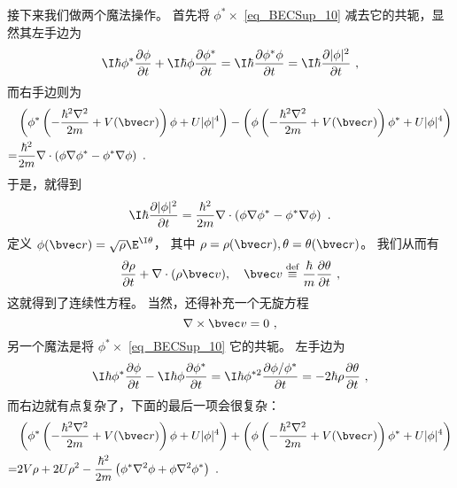 接下来我们做两个魔法操作。 首先将 $\phi^*\times$ \autoref{eq_BECSup_10} 减去它的共轭，显然其左手边为
\begin{equation}
\I\hbar\phi^*\frac{\partial\phi}{\partial t} + \I\hbar\phi\frac{\partial\phi^*}{\partial t} = \I\hbar\frac{\partial\phi^*\phi}{\partial t} = \I\hbar\frac{\partial|\phi|^2}{\partial t}~,
\end{equation}
而右手边则为
\begin{equation}
\begin{split}
&\left(\phi^* \left(-\frac{\hbar^2\nabla^2}{2m}+V({\bvec r})\right)\phi + U|\phi|^4\right) -\left(\phi \left(-\frac{\hbar^2\nabla^2}{2m}+V({\bvec r})\right)\phi^* + U|\phi|^4\right) \\
=& \frac{\hbar^2}{2m}\nabla\cdot\left(\phi\nabla\phi^* - \phi^*\nabla\phi\right)~.
\end{split}
\end{equation}
于是，就得到
\[\I\hbar\frac{\partial|\phi|^2}{\partial t} = \frac{\hbar^2}{2m}\nabla\cdot\left(\phi\nabla\phi^* - \phi^*\nabla\phi\right) ~.\]
定义 $\phi({\bvec r}) = \sqrt{\rho}\E^{\I\theta}$， 其中 $\rho = \rho({\bvec r}),\theta = \theta({\bvec r})$。
我们从而有
\begin{equation}\frac{\partial\rho}{\partial t} + \nabla\cdot(\rho{\bvec v}),\quad {\bvec v}\overset{\text{def}}{\equiv}\frac{\hbar}{m}\frac{\partial\theta}{\partial t}~, \end{equation}
这就得到了连续性方程。 当然，还得补充一个无旋方程
\begin{equation}
\nabla\times{\bvec v}=0~,
\end{equation}
另一个魔法是将 $\phi^*\times$ \autoref{eq_BECSup_10} %
它的共轭。 左手边为
\begin{equation}
\I\hbar\phi^*\frac{\partial\phi}{\partial t} - \I\hbar\phi\frac{\partial\phi^*}{\partial t} = \I\hbar\phi^{*2}\frac{\partial \phi/\phi^*}{\partial t} = -2\hbar\rho\frac{\partial\theta}{\partial t}~,
\end{equation}
而右边就有点复杂了，下面的最后一项会很复杂：
\begin{equation}
\begin{split}
&\left(\phi^* \left(-\frac{\hbar^2\nabla^2}{2m}+V({\bvec r})\right)\phi + U|\phi|^4\right) + \left(\phi \left(-\frac{\hbar^2\nabla^2}{2m}+V({\bvec r})\right)\phi^* + U|\phi|^4\right) \\
=& 2V\rho + 2U\rho^2 - \frac{\hbar^2}{2m}\left(\phi^*\nabla^2\phi + \phi\nabla^2\phi^*\right)~.
\end{split}
\end{equation}

